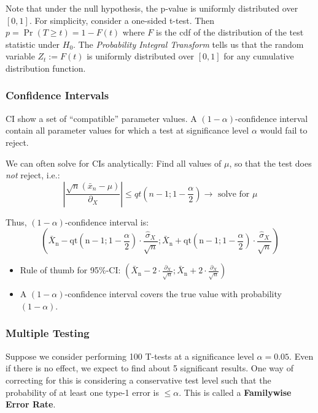 \documentclass[11pt, %
	oneside, %
	english, %
	onehalfspacing, %
	]{article} %
\numberwithin{equation}{section}
\begin{document}
Note that under the null hypothesis, the p-value is uniformly distributed over $[0,1]$. For simplicity, consider a one-sided t-test. Then $p = \operatorname{Pr}(T \geq t) = 1-F(t)$ where $F$ is the cdf of the distribution of the test statistic under $H_0$. The \emph{Probability Integral Transform} tells us that the random variable $Z_t :=  F(t)$ is uniformly distributed over $[0,1]$ for any cumulative distribution function.


\subsubsection*{Confidence Intervals}

CI show a set of ``compatible'' parameter values. A $(1-\alpha)$-confidence interval contain all parameter values for which a test at significance level $\alpha$ would fail to reject.


We can often solve for CIs analytically: Find all values of $\mu$, so that the test does \emph{not} reject, i.e.:
$$
\left|\frac{\sqrt{n}\left(\bar{x}_n-\mu\right)}{\partial_X}\right| \leq q t\left(n-1 ; 1-\frac{\alpha}{2}\right) \rightarrow \text { solve for } \mu
$$

Thus, $(1-\alpha)$-confidence interval is:
$$
\left(\bar{X}_{\mathrm{n}}-\mathrm{qt}\left(\mathrm{n}-1 ; 1-\frac{\alpha}{2}\right)\cdot \frac{\hat{\sigma}_X}{\sqrt{n}} ; \bar{X}_{\mathrm{n}}+\mathrm{qt}\left(\mathrm{n}-1 ; 1-\frac{\alpha}{2}\right)\cdot \frac{\hat{\sigma}_X}{\sqrt{n}}\right)
$$

\begin{itemize}
    \item Rule of thumb for 95\%-CI: $\left(\bar{X}_{\mathrm{n}}-2\cdot \frac{\partial_X}{\sqrt{n}} ; \bar{X}_{\mathrm{n}}+2\cdot \frac{\partial_X}{\sqrt{n}}\right)$
    \item A $(1-\alpha)$-confidence interval covers the true value with probability $(1-\alpha)$.
\end{itemize}

\subsubsection*{Multiple Testing}

Suppose we consider performing 100 T-tests at a significance level $\alpha = 0.05$. Even if there is no effect, we expect to find about 5 significant results. One way of correcting for this is considering a conservative test level such that the probability of at least one type-1 error is $\leq \alpha$. This is called a \textbf{Familywise Error Rate}.
\end{document}

